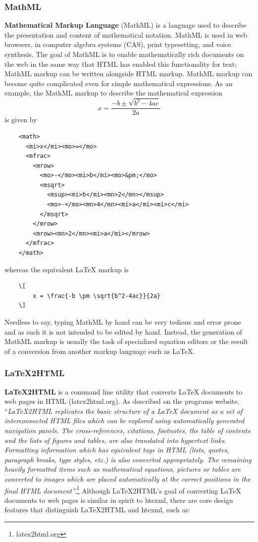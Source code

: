 \documentclass[11pt]{article}
\begin{document}
\subsubsection{MathML}
\textbf{Mathematical Markup Language} (MathML) is a language used to describe the presentation and content of mathematical notation.  MathML is used in web browsers, in computer algebra systems (CAS), print typesetting, and voice synthesis.  The goal of MathML is to enable mathematically rich documents on the web in the same way that HTML has enabled this functionality for text; MathML markup can be written alongside HTML markup.  MathML markup can become quite complicated even for simple mathematical expressions.  As an example, the MathML markup to describe the mathematical expression
\[
x = \frac{-b \pm\sqrt{b^2-4ac}}{2a}
\]
is given by
\begin{verbatim}
    <math>
      <mi>x</mi><mo>=</mo>
      <mfrac>
        <mrow>
          <mo>-</mo><mi>b</mi><mo>&pm;</mo>
          <msqrt>
            <msup><mi>b</mi><mn>2</mn></msup>
            <mo>-</mo><mn>4</mn><mi>a</mi><mi>c</mi>
          </msqrt>
        </mrow>
        <mrow><mn>2</mn><mi>a</mi></mrow>
      </mfrac>
    </math>
\end{verbatim}
whereas the equivalent LaTeX markup is
\begin{verbatim}
    \[
        x = \frac{-b \pm \sqrt{b^2-4ac}}{2a}
    \]
\end{verbatim}
Needless to say, typing MathML by hand can be very tedious and error prone and as such it is not intended to be edited by hand.  Instead, the generation of MathML markup is usually the task of specialized equation editors or the result of a conversion from another markup language such as LaTeX.
 
\subsubsection{LaTeX2HTML}
\textbf{LaTeX2HTML} is a command line utility that converts LaTeX documents to web pages in HTML (latex2html.org).  As described on the programs website, ``\textit{LaTeX2HTML replicates the basic structure of a LaTeX document as a set of interconnected HTML files which can be explored using automatically generated navigation panels. The cross-references, citations, footnotes, the table of contents and the lists of figures and tables, are also translated into hypertext links. Formatting information which has equivalent tags in HTML (lists, quotes, paragraph breaks, type styles, etc.) is also converted appropriately. The remaining heavily formatted items such as mathematical equations, pictures or tables are converted to images which are placed automatically at the correct positions in the final HTML document''.}\footnote{latex2html.org}  Although LaTeX2HTML's goal of converting LaTeX documents to web pages is similar in spirit to htexml, there are core design features that distinguish LaTeX2HTML and htexml, such as:
\end{document}
